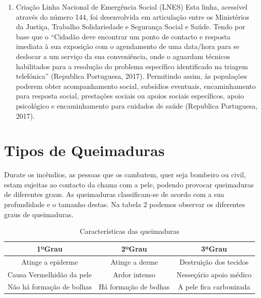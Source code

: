 \documentclass[a4paper,11pt]{report}
\begin{document}
\begin{enumerate}
\begin{itemize}
 \end{itemize}
 
 \item Criação Linha Nacional de Emergência Social (LNES)
  Esta linha, acessível através do número 144, foi desenvolvida em articulação entre os Ministérios da Justiça, Trabalho Solidariedade e Segurança Social e Saúde. Tendo por base que o “Cidadão deve encontrar um ponto de contacto e resposta imediata à sua exposição com o agendamento de uma data/hora para se deslocar a um serviço da sua conveniência, onde o aguardam técnicos habilitados para a resolução do problema específico identificado na triagem telefónica” (Republica Portuguesa, 2017). Permitindo assim, às populações poderem obter acompanhamento social, subsídios eventuais, encaminhamento para resposta social, prestações sociais ou apoios sociais específicos, apoio psicológico e encaminhamento para cuidados de saúde (Republica Portuguesa, 2017).


 \end{enumerate}

 
\part{Tipos de Queimaduras} 
Durate os incêndios, as pessoas que os cambatem, quer seja bombeiro ou civil,  estam sujeitas ao contacto da chama com a pele, podendo provocar queimaduras de diferentes graus.
As queimaduras classificam-se de acordo com a sua profundidade e o tamanho destas.
Na tabela 2 podemos observar os diferentes graus de queimaduras.

 \begin{table}
 \begin{tabular}{|c||c||c|}
\hline  
   \textbf{1ºGrau}	  	&  \textbf{2ºGrau}	  &  \textbf{3ªGrau}		 \\  \hline
   Atinge a epiderme		&  Atinge a derme         &  Destruição dos tecidos \\  \hline
   Causa Vermelhidão da pele   	&  Ardor intenso	  &  Nesseçário apoio médico \\  \hline
   Não há formação de bolhas    &  Há formação de bolhas  &  A pele fica carbonizada \\  \hline
\end{tabular}
\caption{Características das queimaduras}
\end{table}
 
\end{document}
